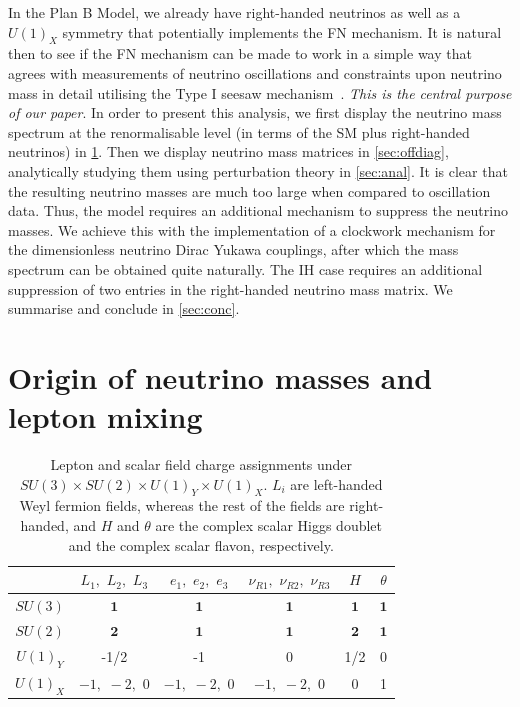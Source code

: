 \documentclass[11pt,letterpaper]{article}
\newcommand{\model}{Plan B Model}
\begin{document}
In the \model, we already have right-handed neutrinos as well as a $U(1)_X$
symmetry that potentially implements the FN mechanism. It is natural then to
see if the FN mechanism can be made to work in a simple way that agrees with
measurements of neutrino oscillations and constraints upon neutrino mass in
detail utilising the Type I seesaw
mechanism~\cite{Minkowski:1977sc,Yanagida:1980xy,Glashow:1979nm,Mohapatra:1979ia,Schechter:1979bn}. \emph{This
is the central purpose of our paper}.
In order to present this analysis, we first
display the neutrino mass spectrum at the renormalisable level (in terms of
the SM plus right-handed neutrinos) in \cref{sec:origin}. Then we display
neutrino mass matrices in \cref{sec:offdiag}, analytically studying them
using perturbation theory in \cref{sec:anal}.
It is clear that the resulting neutrino masses are much too large when
compared to oscillation data. 
Thus, the model requires an additional mechanism to suppress the neutrino
masses. 
We achieve this with the
implementation of a clockwork mechanism
for the dimensionless neutrino Dirac Yukawa couplings, after which the  
mass spectrum can be obtained quite naturally. The IH case requires an additional 
suppression of two entries in the right-handed neutrino mass matrix. 
We summarise and conclude in \cref{sec:conc}.

\section{Origin of neutrino masses and lepton mixing} \label{sec:origin}

\begin{table}[ht]
\centering
\setlength{\tabcolsep}{10pt}     %
\renewcommand{\arraystretch}{1.2}  %
\begin{tabular}{|c|c|c|c|c|c|}
    \hline
     & $L_1, \,\, L_2, \,\, L_3$ & $e_1, \,\, e_2, \,\, e_3$ & $\nu_{R1}, \,\, \nu_{R2}, \,\, \nu_{R3}$& $H$ &$\theta$\\
    \hline
    $SU(3)$ & $\bm{1}$ & $\bm{1}$ & $\bm{1}$ & $\bm{1}$ & $\bm{1}$ \\
    $SU(2)$ & $\bm{2}$ & $\bm{1}$ & $\bm{1}$ & $\bm{2}$ & $\bm{1}$ \\
    $U(1)_Y$ & -1/2 & -1 & 0 & 1/2 & 0 \\
    $U(1)_X$ & $-1, \,\, -2, \,\, 0$
    & $-1, \,\, -2, \,\, 0$ & $-1, \,\, -2, \,\, 0$ & 0 & 1 \\
    \hline
\end{tabular}
\caption{Lepton and scalar field charge assignments under 
$SU(3)\!\times\!SU(2)\!\times\!U(1)_Y\!\times\!U(1)_X$. $L_i$ are left-handed
  Weyl fermion fields, whereas the rest of the fields are right-handed, and
  $H$ and $\theta$ are the complex scalar Higgs doublet and the complex scalar
  flavon, respectively.
}
\label{tab:lepton_charges}
\end{table}
\end{document}
